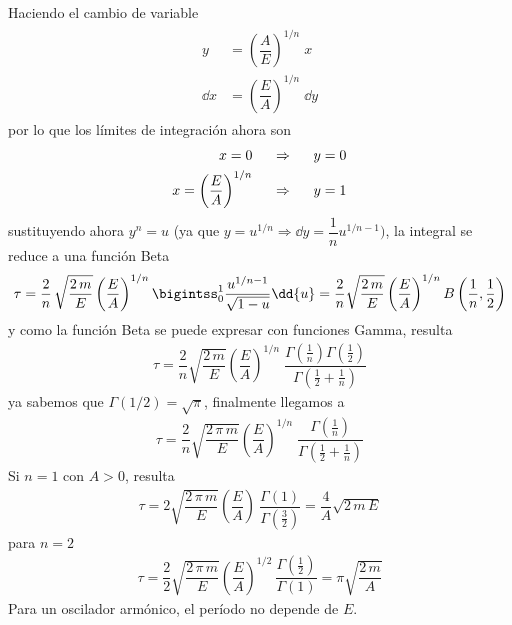 Haciendo el cambio de variable
\begin{align}
\begin{aligned}
y &= \left( \dfrac{A}{E} \right)^{1/n} \; x \\
\dd{x} &= \left( \dfrac{E}{A} \right)^{1/n} \; \dd{y}
\end{aligned}
\end{align}
por lo que los límites de integración ahora son
\begin{align}
\begin{aligned}
x = 0 & \hspace{0.5cm} \Rightarrow \hspace{0.5cm} y = 0 \\
x = \left( \dfrac{E}{A} \right)^{1/n} & \hspace{0.5cm} \Rightarrow \hspace{0.5cm} y = 1
\end{aligned}
\end{align}
sustituyendo ahora $y^{n} = u$ (ya que $y = u^{1/n} \Rightarrow \dd{y} = \dfrac{1}{n} u^{1/n - 1})$, la integral se reduce a una función Beta
\begin{align*}
\tau = \dfrac{2}{n} \, \sqrt{\dfrac{2 \, m}{E}} \left( \dfrac{E}{A} \right)^{1/n} \bigintss_{0}^{1} \dfrac{u^{1/n - 1}}{\sqrt{1 - u}} \dd{u}  = \dfrac{2}{n} \sqrt{\dfrac{2 \, m}{E}} \left( \dfrac{E}{A} \right)^{1/n} B \left( \dfrac{1}{n}, \dfrac{1}{2} \right)
\end{align*}
y como la función Beta se puede expresar con funciones Gamma, resulta
\begin{align*}
\tau = \dfrac{2}{n} \sqrt{\dfrac{2 \, m}{E}} \left( \dfrac{E}{A} \right)^{1/n} \; \dfrac{\Gamma \left( \frac{1}{n} \right) \Gamma \left( \frac{1}{2} \right) }{\Gamma \left( \frac{1}{2} + \frac{1}{n} \right)}
\end{align*}
ya sabemos que $\Gamma (1/2) = \sqrt{\pi}$, finalmente llegamos a
\begin{align*}
\tau = \dfrac{2}{n} \sqrt{\dfrac{2 \, \pi \, m}{E}} \left( \dfrac{E}{A} \right)^{1/n} \; \dfrac{\Gamma \left( \frac{1}{n} \right) }{\Gamma \left( \frac{1}{2} + \frac{1}{n} \right)}
\end{align*}
Si $n = 1 \mbox{ con } A > 0$, resulta
\begin{align*}
\tau = 2 \sqrt{\dfrac{2 \, \pi \, m }{E}} \left( \dfrac{E}{A} \right) \: \dfrac{\Gamma (1)}{\Gamma (\frac{3}{2})} = \dfrac{4}{A} \sqrt{2 \, m \, E}
\end{align*}
para $n = 2$
\begin{align*}
\tau = \dfrac{2}{2} \sqrt{\dfrac{2 \, \pi \, m }{E}} \left( \dfrac{E}{A} \right)^{1/2} \: \dfrac{\Gamma (\frac{1}{2})}{\Gamma (1)}  =  \pi \sqrt{\dfrac{2 \, m}{A}}
\end{align*}
Para un oscilador armónico, el período no depende de $E$.
